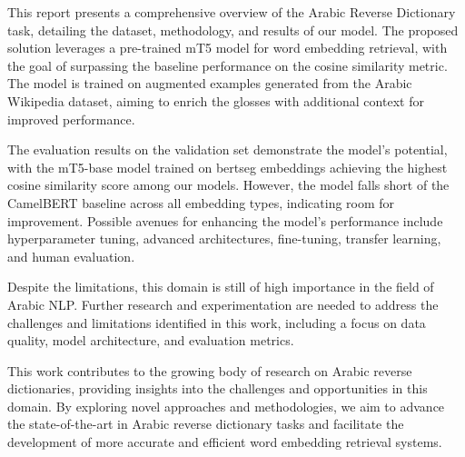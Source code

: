 \documentclass[12.5pt]{article}
\begin{document}
This report presents a comprehensive overview of the Arabic Reverse Dictionary task, detailing the dataset, methodology, and results of our model. The proposed solution leverages a pre-trained mT5 model for word embedding retrieval, with the goal of surpassing the baseline performance on the cosine similarity metric. The model is trained on augmented examples generated from the Arabic Wikipedia dataset, aiming to enrich the glosses with additional context for improved performance.

The evaluation results on the validation set demonstrate the model's potential, with the mT5-base model trained on bertseg embeddings achieving the highest cosine similarity score among our models. However, the model falls short of the CamelBERT baseline across all embedding types, indicating room for improvement. Possible avenues for enhancing the model's performance include hyperparameter tuning, advanced architectures, fine-tuning, transfer learning, and human evaluation.

Despite the limitations, this domain is still of high importance in the field of Arabic NLP. Further research and experimentation are needed to address the challenges and limitations identified in this work, including a focus on data quality, model architecture, and evaluation metrics.

This work contributes to the growing body of research on Arabic reverse dictionaries, providing insights into the challenges and opportunities in this domain. By exploring novel approaches and methodologies, we aim to advance the state-of-the-art in Arabic reverse dictionary tasks and facilitate the development of more accurate and efficient word embedding retrieval systems.

\newpage

\printbibliography[title={References}]\label{lastpage}
\end{document}
